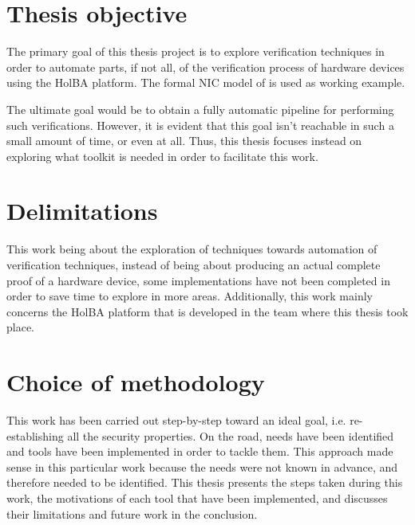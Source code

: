 \documentclass[10pt,a4paper]{article}
\begin{document}
\section{Thesis objective}

The primary goal of this thesis project is to explore verification techniques in order to automate parts, if not all, of the verification process of hardware devices using the HolBA platform. The formal {NIC} model of \cite{haglund_formal_2016} is used as working example.

The ultimate goal would be to obtain a fully automatic pipeline for performing such verifications. However, it is evident that this goal isn't reachable in such a small amount of time, or even at all. Thus, this thesis focuses instead on exploring what toolkit is needed in order to facilitate this work.

\section{Delimitations}

This work being about the exploration of techniques towards automation of verification techniques, instead of being about producing an actual complete proof of a hardware device, some implementations have not been completed in order to save time to explore in more areas. Additionally, this work mainly concerns the HolBA platform that is developed in the team where this thesis took place.

\section{Choice of methodology}

This work has been carried out step-by-step toward an ideal goal, i.e. re-establishing all the security properties. On the road, needs have been identified and tools have been implemented in order to tackle them. This approach made sense in this particular work because the needs were not known in advance, and therefore needed to be identified. This thesis presents the steps taken during this work, the motivations of each tool that have been implemented, and discusses their limitations and future work in the conclusion.

\end{document}
